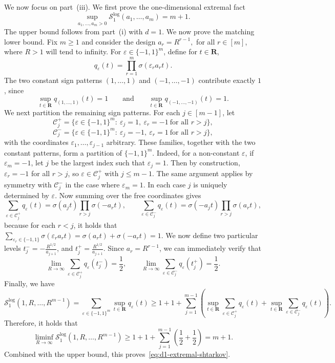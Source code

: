 \documentclass[11pt, letterpaper, hidelinks]{article}
\makeatletter
\renewcommand{\proofname}{\textit{\textbf{Proof}}}
\renewenvironment{proof}[1][\proofname]{\par\pushQED{\qed}\normalfont \topsep6\p@\@plus6\p@\relax\trivlist\item[\hskip\labelsep#1\@addpunct{}]\ignorespaces}{\popQED\endtrivlist\@endpefalse}
\newcommand{\R}{\mathbf R}
\newcommand{\1}{\mathbf 1}
\newcommand{\eps}{\varepsilon}
\renewcommand{\ge}{\geqslant}
\renewcommand{\leq}{\leqslant}
\renewcommand{\geq}{\geqslant}
\theoremstyle{plain}
\theoremstyle{definition}
\newcommand{\defn}{=}
\makeatother
\begin{document}
\begin{proof}
We now focus on part~(iii). We first prove the one-dimensional extremal fact
\begin{equation}
\label{eq:d1-extremal-shtarkov}
\sup_{a_1,\dots,a_m>0}\mathcal S_1^{\operatorname{log}}(a_1,\dots,a_m)=m+1.
\end{equation}
The upper bound follows from part~(i) with $d=1$. We now prove the matching lower bound. Fix $m\geq 1$ and consider the  design
$
a_r=R^{r-1},
$
for all $r\in [m]$, 
where $R>1$ will tend to infinity. For $\eps\in\{-1,1\}^m$, define for $t \in \R$,
\[
q_\eps(t)\defn \prod_{r=1}^m \sigma(\eps_r a_r t).
\]
The two constant sign patterns $(1,\dots,1)$ and $(-1,\dots,-1)$ contribute exactly $1$, since
\[
\sup_{t\in\R} q_{(1,\dots,1)}(t)=1
\qquad\text{and}\qquad
\sup_{t\in\R} q_{(-1,\dots,-1)}(t)=1.
\]
We next partition the remaining sign patterns. For each $j\in[m-1]$, let
\[
\mathcal C_j^+
\defn
\{\eps\in\{-1,1\}^m:\ \eps_j=1,\ \eps_r=-1 \ \mbox{for all } r>j\},
\]
\[
\mathcal C_j^-
\defn
\{\eps\in\{-1,1\}^m:\ \eps_j=-1,\ \eps_r=1 \ \mbox{for all } r>j\},
\]
with the coordinates $\eps_1,\dots,\eps_{j-1}$ arbitrary. These families, together with the two constant patterns, form a partition of $\{-1,1\}^m$. Indeed, for a non-constant $\eps$, if $\eps_m=-1$, let $j$ be the largest index such that $\eps_j=1$. Then by construction, $\eps_r=-1$ for all $r>j$, so $\eps\in\mathcal C_j^+$ with $j\leq m-1$. The same argument applies by symmetry with $\mathcal C_j^-$ in the case where $\eps_m=1$. In each case $j$ is uniquely determined by $\eps$. Now summing over the free coordinates gives
\[
\sum_{\eps\in\mathcal C_j^+} q_\eps(t)
=
\sigma(a_j t)\prod_{r>j}\sigma(-a_r t),
\qquad
\sum_{\eps\in\mathcal C_j^-} q_\eps(t)
=
\sigma(-a_j t)\prod_{r>j}\sigma(a_r t),
\]
because for each $r<j$, it holds that 
$
\sum_{\eps_r\in\{-1,1\}}\sigma(\eps_r a_r t)=\sigma(a_r t)+\sigma(-a_r t)=1.
$
We now define two particular levels 
$
t_j^- \defn -\frac{R^{1/2}}{a_{j+1}}$, and $
t_j^+ \defn \frac{R^{1/2}}{a_{j+1}}.
$
Since $a_r=R^{r-1}$, we can immediately verify that
\[
\lim_{R \to \infty}\sum_{\eps\in\mathcal C_j^+} q_\eps(t_j^-)= \frac12,
\qquad
\lim_{R \to \infty}\sum_{\eps\in\mathcal C_j^-} q_\eps(t_j^+)= \frac12.
\]
Finally, we have
\[
\mathcal S_1^{\operatorname{log}}(1,R,\dots,R^{m-1})
=
\sum_{\eps\in\{-1,1\}^m} \sup_{t\in\R} q_\eps(t) 
\ge
1+1+\sum_{j=1}^{m-1}
\left(
\sup_{t\in\R}\sum_{\eps\in\mathcal C_j^+} q_\eps(t)
+
\sup_{t\in\R}\sum_{\eps\in\mathcal C_j^-} q_\eps(t)
\right).\]
Therefore, it holds that
\[
\liminf_{R\to\infty}\mathcal S_1^{\operatorname{log}}(1,R,\dots,R^{m-1})
\ge
1+1+\sum_{j=1}^{m-1}\left(\frac12+\frac12\right)
=
m+1.
\]
Combined with the upper bound, this proves~\eqref{eq:d1-extremal-shtarkov}.


\end{proof}
\end{document}
